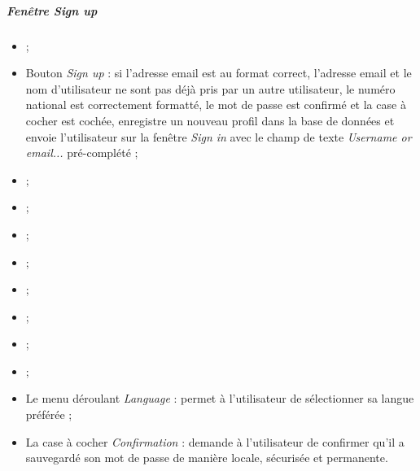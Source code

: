 \subparagraph{Fenêtre \emph{Sign up}}
\begin{itemize}
\item {} ;
\item Bouton \emph{Sign up} : si l'adresse email est au format correct, l'adresse email et le nom d'utilisateur ne sont pas déjà pris par un autre utilisateur, le numéro national est correctement formatté, le mot de passe est confirmé et la case à cocher est cochée, enregistre un nouveau profil dans la base de données et envoie l'utilisateur sur la fenêtre \emph{Sign in} avec le champ de texte \emph{Username or email...} pré-complété ;
\item {} ;
\item {} ;
\item {} ;
\item {} ;
\item {} ;
\item {} ;
\item {} ;
\item {} ;
\item Le menu déroulant \emph{Language} : permet à l'utilisateur de sélectionner sa langue préférée ;
\item La case à cocher \emph{Confirmation} : demande à l'utilisateur de confirmer qu'il a sauvegardé son mot de passe de manière locale, sécurisée et permanente.
\end{itemize}


